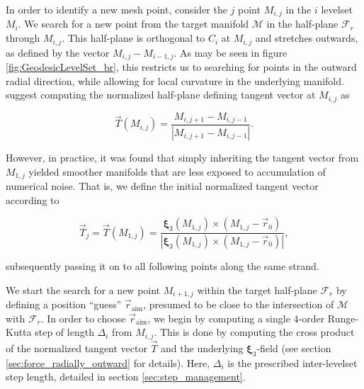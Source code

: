 In order to identify a new mesh point, consider the $j$ point $M_{i,j}$ in the $i$ levelset $M_i$. We search for a new point from the target manifold $\mathcal{M}$ in the half-plane $\mathcal{F}_r$ through $M_{i,j}$. This half-plane is orthogonal to $C_i$ at $M_{i,j}$ and stretches outwards, as defined by the vector $M_{i,j}-M_{i-1,j}$. As may be seen in figure \ref{fig:GeodesicLevelSet_br}, this restricts us to searching for points in the outward radial direction, while allowing for local curvature in the underlying manifold. \cite{Survey} suggest computing the normalized half-plane defining tangent vector at $M_{i,j}$ as

\begin{equation}\label{eq:surveyT}
\vec{T}(M_{i,j})=\frac{M_{i,j+1}-M_{i,j-1}}{\left|M_{i,j+1}-M_{i,j-1}\right|}.
\end{equation}

\noindent However, in practice, it was found that simply inheriting the tangent vector from $M_{1,j}$ yielded smoother manifolds that are less exposed to accumulation of numerical noise. That is, we define the initial normalized tangent vector according to

\begin{equation}\label{eq:ourT}
\vec{T}_j = \vec{T}(M_{1,j}) = \frac{\bm{\xi}_3(M_{1,j}) \times \left(M_{1,j}-\vec{r}_0\right)}{\left| \bm{\xi}_3(M_{1,j}) \times \left(M_{1,j}-\vec{r}_0\right)\right|},
\end{equation}

\noindent subsequently passing it on to all following points along the same strand. 




We start the search for a new point $M_{i+1,j}$ within the target half-plane $\mathcal{F}_r$ by defining a position ``guess'' $\vec{r}_{\text{aim}}$, presumed to be close to the intersection of $\mathcal{M}$ with $\mathcal{F}_r$. In order to choose $\vec{r}_{\text{aim}}$, we begin by computing a single $4$-order Runge-Kutta step of length $\Delta_i$ from $M_{i,j}$. This is done by computing the cross product of the normalized tangent vector $\vec{T}$  and the underlying $\bm{\xi}_3$-field (see section \ref{sec:force_radially_outward} for details). Here, $\Delta_i$ is the prescribed inter-levelset step length, detailed in section \ref{sec:step_management}. %


